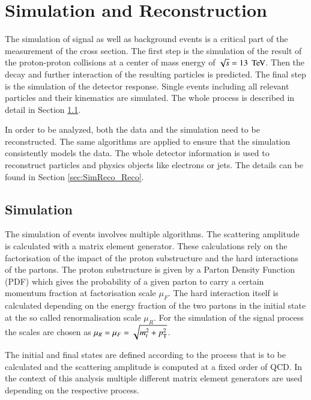 
\chapter{Simulation and Reconstruction}

The simulation of signal as well as background events is a critical part of the measurement
of the \ttbar cross section. The first step is the simulation of the result of the proton-proton 
collisions at a center of mass energy of $\sqrt{s} = 13 \; \,\text{Te\hspace{-.08em}V}$. Then the decay and further interaction 
of the resulting particles is predicted. The final step is the simulation of the detector response.
Single events including all relevant particles and their kinematics are simulated.
The whole process is described in detail in Section \ref{sec:SimReco_Sim}.

In order to be analyzed, both the data and the simulation need to be reconstructed. The same algorithms are applied to ensure
that the simulation consistently models the data. 
The whole detector information is used to reconstruct particles and physics objects like electrons or jets.
The details can be found in Section \ref{sec:SimReco_Reco}. 


\section{Simulation}
\label{sec:SimReco_Sim}

The simulation of events involves multiple algorithms.
The scattering amplitude is calculated with a matrix element generator. These calculations rely on the factorisation of the impact of the proton substructure and the hard 
interactions of the partons. The proton substructure is given by a Parton Density Function (PDF) which gives the probability of a given parton to carry a certain momentum fraction 
at factorisation scale $\mu_F$. The hard interaction itself is calculated depending on the energy fraction of the two partons in the initial state at the so called renormalisation scale $\mu_R$.
For the simulation of the \ttbar signal process the scales are chosen as $\mu_R = \mu_F = \sqrt{m_t^2 + p_{\mathrm{T}}^2}$.



The initial and final states are defined according to the process that is to be calculated and the scattering amplitude is computed at
a fixed order of QCD. In the context of this analysis multiple different matrix element generators are used depending on the respective process.



